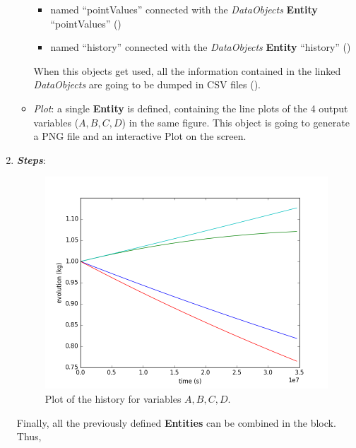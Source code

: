 \begin{enumerate}
\begin{itemize}
     \begin{itemize}
       \item named ``pointValues'' connected with the \textit{DataObjects} \textbf{Entity} ``pointValues''
                ()
       \item named ``history'' connected with the \textit{DataObjects} \textbf{Entity} ``history'' ()
     \end{itemize}
      When this objects get used, all the information contained in the linked  \textit{DataObjects} are going
    to be dumped in CSV files ().
    \item \textit{Plot}: a single  \textbf{Entity} is defined, containing the line plots of the 4 output variables
    ($A,B,C,D$) in the same figure. This object is going to generate a PNG file and an interactive Plot on
    the screen.
  \end{itemize}
   \item \textbf{\textit{Steps}}:
 \begin{figure}[h!]
  \centering
  \includegraphics[scale=0.7]{../../tests/framework/user_guide/SingleRuns/gold/sectionVI.I/1-historyPlot_line-line-line-line.png}
  \caption{Plot of the history for variables $A,B,C,D$.}
  \label{fig:historyPlotLine}
 \end{figure}
   Finally, all the previously defined \textbf{Entities} can be combined in the  block. Thus,

\end{enumerate}
